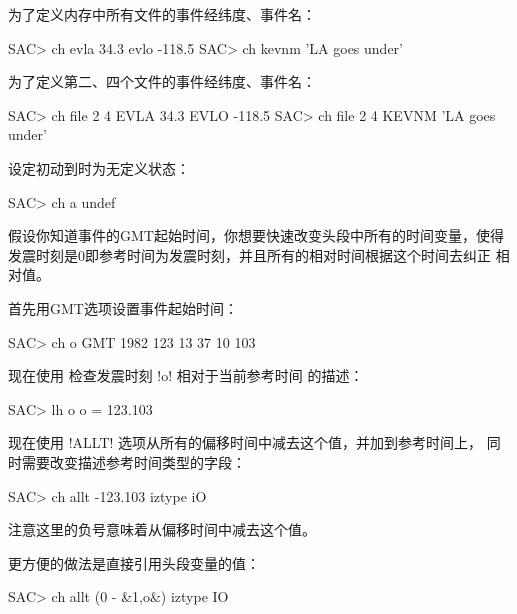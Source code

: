 为了定义内存中所有文件的事件经纬度、事件名：
\begin{SACCode}
SAC> ch evla 34.3 evlo -118.5
SAC> ch kevnm 'LA goes under'
\end{SACCode}

为了定义第二、四个文件的事件经纬度、事件名：
\begin{SACCode}
SAC> ch file 2 4 EVLA 34.3 EVLO -118.5
SAC> ch file 2 4 KEVNM 'LA goes under'
\end{SACCode}

设定初动到时为无定义状态：
\begin{SACCode}
SAC> ch a undef
\end{SACCode}

假设你知道事件的GMT起始时间，你想要快速改变头段中所有的时间变量，使得
发震时刻是0即参考时间为发震时刻，并且所有的相对时间根据这个时间去纠正
相对值。

首先用GMT选项设置事件起始时间：
\begin{SACCode}
SAC> ch o GMT 1982 123 13 37 10 103
\end{SACCode}
现在使用  检查发震时刻 !o! 相对于当前参考时间
的描述：
\begin{SACCode}
SAC> lh o
 o = 123.103
\end{SACCode}
现在使用 !ALLT! 选项从所有的偏移时间中减去这个值，并加到参考时间上，
同时需要改变描述参考时间类型的字段：
\begin{SACCode}
SAC> ch allt -123.103 iztype iO
\end{SACCode}
注意这里的负号意味着从偏移时间中减去这个值。

更方便的做法是直接引用头段变量的值：
\begin{SACCode}
SAC> ch allt (0 - &1,o&) iztype IO
\end{SACCode}
